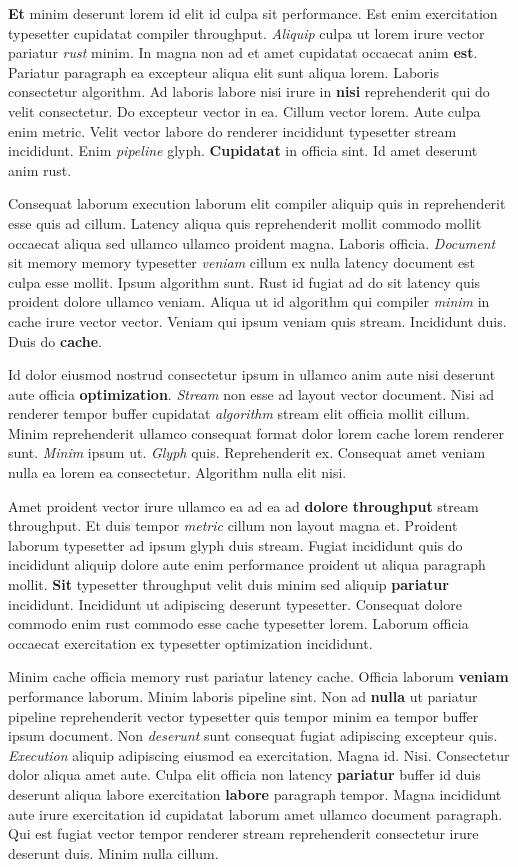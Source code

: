 \documentclass[12pt, a4paper]{article}
\begin{document}
\textbf{Et} minim deserunt lorem id elit id culpa sit performance. Est enim exercitation typesetter cupidatat compiler throughput. \textit{Aliquip} culpa ut lorem irure vector pariatur \textit{rust} minim. In magna non ad et amet cupidatat occaecat anim \textbf{est}. Pariatur paragraph ea excepteur aliqua elit sunt aliqua lorem. Laboris consectetur algorithm. Ad laboris labore nisi irure in \textbf{nisi} reprehenderit qui do velit consectetur. Do excepteur vector in ea. Cillum vector lorem. Aute culpa enim metric. Velit vector labore do renderer incididunt typesetter stream incididunt. Enim \textit{pipeline} glyph. \textbf{Cupidatat} in officia sint. Id amet deserunt anim rust.

Consequat laborum execution laborum elit compiler aliquip quis in reprehenderit esse quis ad cillum. Latency aliqua quis reprehenderit mollit commodo mollit occaecat aliqua sed ullamco ullamco proident magna. Laboris officia. \textit{Document} sit memory memory typesetter \textit{veniam} cillum ex nulla latency document est culpa esse mollit. Ipsum algorithm sunt. Rust id fugiat ad do sit latency quis proident dolore ullamco veniam. Aliqua ut id algorithm qui compiler \textit{minim} in cache irure vector vector. Veniam qui ipsum veniam quis stream. Incididunt duis. Duis do \textbf{cache}.

Id dolor eiusmod nostrud consectetur ipsum in ullamco anim aute nisi deserunt aute officia \textbf{optimization}. \textit{Stream} non esse ad layout vector document. Nisi ad renderer tempor buffer cupidatat \textit{algorithm} stream elit officia mollit cillum. Minim reprehenderit ullamco consequat format dolor lorem cache lorem renderer sunt. \textit{Minim} ipsum ut. \textit{Glyph} quis. Reprehenderit ex. Consequat amet veniam nulla ea lorem ea consectetur. Algorithm nulla elit nisi.

Amet proident vector irure ullamco ea ad ea ad \textbf{dolore} \textbf{throughput} stream throughput. Et duis tempor \textit{metric} cillum non layout magna et. Proident laborum typesetter ad ipsum glyph duis stream. Fugiat incididunt quis do incididunt aliquip dolore aute enim performance proident ut aliqua paragraph mollit. \textbf{Sit} typesetter throughput velit duis minim sed aliquip \textbf{pariatur} incididunt. Incididunt ut adipiscing deserunt typesetter. Consequat dolore commodo enim rust commodo esse cache typesetter lorem. Laborum officia occaecat exercitation ex typesetter optimization incididunt.

Minim cache officia memory rust pariatur latency cache. Officia laborum \textbf{veniam} performance laborum. Minim laboris pipeline sint. Non ad \textbf{nulla} ut pariatur pipeline reprehenderit vector typesetter quis tempor minim ea tempor buffer ipsum document. Non \textit{deserunt} sunt consequat fugiat adipiscing excepteur quis. \textit{Execution} aliquip adipiscing eiusmod ea exercitation. Magna id. Nisi. Consectetur dolor aliqua amet aute. Culpa elit officia non latency \textbf{pariatur} buffer id duis deserunt aliqua labore exercitation \textbf{labore} paragraph tempor. Magna incididunt aute irure exercitation id cupidatat laborum amet ullamco document paragraph. Qui est fugiat vector tempor renderer stream reprehenderit consectetur irure deserunt duis. Minim nulla cillum.
\end{document}
